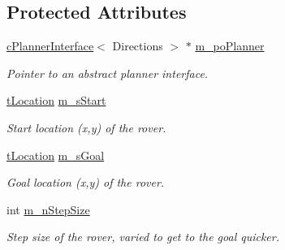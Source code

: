 \subsection*{Protected Attributes}
\begin{DoxyCompactItemize}
\item 
\mbox{\hyperlink{classplanner_1_1c_planner_interface}{c\+Planner\+Interface}}$<$ Directions $>$ $\ast$ \mbox{\hyperlink{classplanner_1_1c_rover_interface_a8e1ffb06f3301b9440da125666ecdc4f}{m\+\_\+po\+Planner}}
\begin{DoxyCompactList}\small\item\em Pointer to an abstract planner interface. \end{DoxyCompactList}\item 
\mbox{\label{classplanner_1_1c_rover_interface_a42552f6e5f1f2909821eaef8535a9979}} 
\mbox{\hyperlink{structplanner_1_1t_location}{t\+Location}} \mbox{\hyperlink{classplanner_1_1c_rover_interface_a42552f6e5f1f2909821eaef8535a9979}{m\+\_\+s\+Start}}
\begin{DoxyCompactList}\small\item\em Start location (x,y) of the rover. \end{DoxyCompactList}\item 
\mbox{\label{classplanner_1_1c_rover_interface_a705221124f88ca9dbdf706869ebfc96a}} 
\mbox{\hyperlink{structplanner_1_1t_location}{t\+Location}} \mbox{\hyperlink{classplanner_1_1c_rover_interface_a705221124f88ca9dbdf706869ebfc96a}{m\+\_\+s\+Goal}}
\begin{DoxyCompactList}\small\item\em Goal location (x,y) of the rover. \end{DoxyCompactList}\item 
\mbox{\label{classplanner_1_1c_rover_interface_aea86540c3962e223de84f28ff067d788}} 
int \mbox{\hyperlink{classplanner_1_1c_rover_interface_aea86540c3962e223de84f28ff067d788}{m\+\_\+n\+Step\+Size}}
\begin{DoxyCompactList}\small\item\em Step size of the rover, varied to get to the goal quicker. \end{DoxyCompactList}\item 
\mbox{\label{classplanner_1_1c_rover_interface_a458f3e469a13cfc909e957678ddee753}} 

\end{DoxyCompactItemize}
